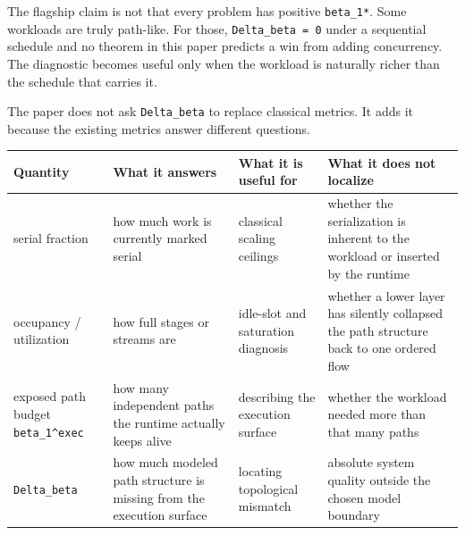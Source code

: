 \documentclass[
  11pt,
]{article}
\newcounter{none} %
\begin{document}
The flagship claim is not that every problem has positive
\texttt{beta\_1*}. Some workloads are truly path-like. For those,
\texttt{Delta\_beta\ =\ 0} under a sequential schedule and no theorem in
this paper predicts a win from adding concurrency. The diagnostic
becomes useful only when the workload is naturally richer than the
schedule that carries it.

The paper does not ask \texttt{Delta\_beta} to replace classical
metrics. It adds it because the existing metrics answer different
questions.

{\def\LTcaptype{none} %
\begin{longtable}[]{@{}
  >{\raggedright\arraybackslash}p{}
  >{\raggedright\arraybackslash}p{}
  >{\raggedright\arraybackslash}p{}
  >{\raggedright\arraybackslash}p{}@{}}
\toprule\noalign{}
\begin{minipage}[b]{\linewidth}\raggedright
Quantity
\end{minipage} & \begin{minipage}[b]{\linewidth}\raggedright
What it answers
\end{minipage} & \begin{minipage}[b]{\linewidth}\raggedright
What it is useful for
\end{minipage} & \begin{minipage}[b]{\linewidth}\raggedright
What it does not localize
\end{minipage} \\
\midrule\noalign{}
\endhead
\bottomrule\noalign{}
\endlastfoot
serial fraction & how much work is currently marked serial & classical
scaling ceilings & whether the serialization is inherent to the workload
or inserted by the runtime \\
occupancy / utilization & how full stages or streams are & idle-slot and
saturation diagnosis & whether a lower layer has silently collapsed the
path structure back to one ordered flow \\
exposed path budget \texttt{beta\_1\^{}exec} & how many independent
paths the runtime actually keeps alive & describing the execution
surface & whether the workload needed more than that many paths \\
\texttt{Delta\_beta} & how much modeled path structure is missing from
the execution surface & locating topological mismatch & absolute system
quality outside the chosen model boundary \\
\end{longtable}
}
\end{document}
